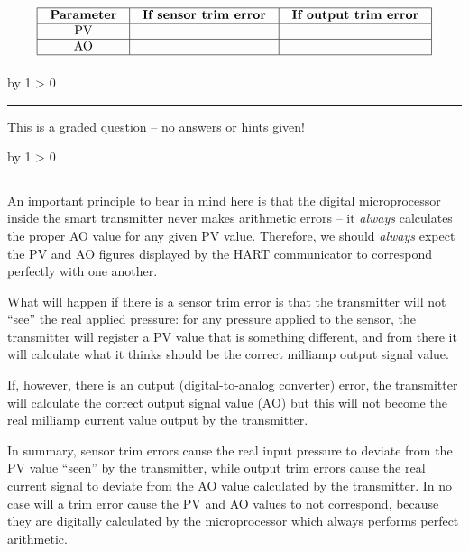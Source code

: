 \documentclass[12pt,a4paper]{article}
\def\svar{
           \advance\answnum by 1
           \ifnum \answnum > 0
                \hrule
                \vskip 3pt
                \leftline{Svar \the\answnum}
                \vskip 3pt \fi}
\def\notes{
           \advance\explnum by 1
           \ifnum \explnum > 0
                \hrule
                \vskip 3pt
                \leftline{Notes \the\explnum}
                \vskip 3pt \fi}
\begin{document}
$$\vbox{\offinterlineskip
\halign{\strut
\vrule \quad\hfil # \ \hfil & 
\vrule \quad\hfil # \ \hfil & 
\vrule \quad\hfil # \ \hfil \vrule \cr
\noalign{\hrule}
%
{\bf Parameter} & {\bf If sensor trim error} & {\bf If output trim error} \cr
%
\noalign{\hrule}
%
PV &  &  \cr
%
\noalign{\hrule}
%
AO &  &  \cr
%
\noalign{\hrule}
} %
}$$ %

\vfil 

\eject
\vskip 10pt \filbreak 





\svar{} 

This is a graded question -- no answers or hints given!

\vskip 10pt \filbreak 





\notes{} 


An important principle to bear in mind here is that the digital microprocessor inside the smart transmitter never makes arithmetic errors -- it {\it always} calculates the proper AO value for any given PV value.  Therefore, we should {\it always} expect the PV and AO figures displayed by the HART communicator to correspond perfectly with one another.

What will happen if there is a sensor trim error is that the transmitter will not ``see'' the real applied pressure: for any pressure applied to the sensor, the transmitter will register a PV value that is something different, and from there it will calculate what it thinks should be the correct milliamp output signal value.

If, however, there is an output (digital-to-analog converter) error, the transmitter will calculate the correct output signal value (AO) but this will not become the real milliamp current value output by the transmitter.

In summary, sensor trim errors cause the real input pressure to deviate from the PV value ``seen'' by the transmitter, while output trim errors cause the real current signal to deviate from the AO value calculated by the transmitter.  In no case will a trim error cause the PV and AO values to not correspond, because they are digitally calculated by the microprocessor which always performs perfect arithmetic.
\end{document}
